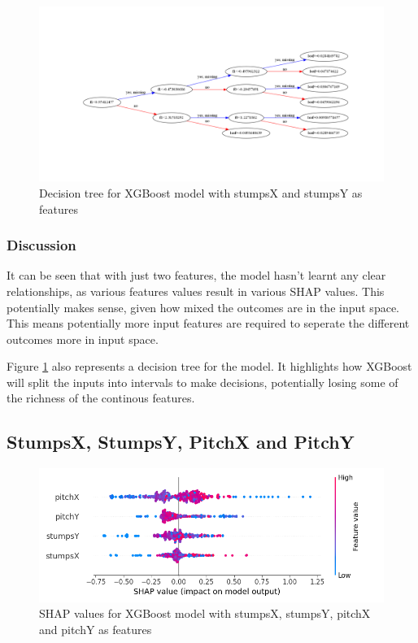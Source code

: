 \documentclass[12pt,a4paper]{report}
\theoremstyle{definition}
\begin{document}
\begin{figure}[H]
    \centering
    \includegraphics[width=\linewidth]{tree_stumps.png}
    \caption{Decision tree for XGBoost model with stumpsX and stumpsY as features}
    \label{fig:TreeStumps}
\end{figure}

\subsubsection{Discussion}

It can be seen that with just two features, the model hasn't learnt any clear relationships, as various features values result in various SHAP values.
This potentially makes sense, given how mixed the outcomes are in the input space.
This means potentially more input features are required to seperate the different outcomes more in input space.

Figure \ref{fig:TreeStumps} also represents a decision tree for the model.
It highlights how XGBoost will split the inputs into intervals to make decisions, potentially losing some of the richness of the continous features.

\subsection{StumpsX, StumpsY, PitchX and PitchY}

\begin{figure}[H]
    \centering
    \includegraphics[width=\linewidth]{shap_stumps_pitch.png}
    \caption{SHAP values for XGBoost model with stumpsX, stumpsY, pitchX and pitchY as features}
    \label{fig:ShapStumpsPitch}
\end{figure}
\end{document}
